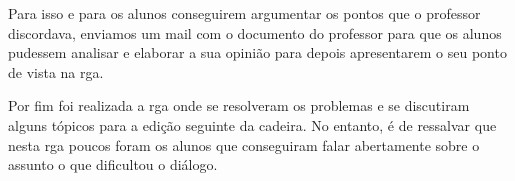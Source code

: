 Para isso e para os alunos conseguirem argumentar os pontos que o professor discordava, enviamos um mail com o documento do professor para que os alunos pudessem analisar e elaborar a sua opinião para depois apresentarem o seu ponto de vista na \acrshort{rga}.

Por fim foi realizada a \acrshort{rga} onde se resolveram os problemas e se discutiram alguns tópicos para a edição seguinte da cadeira. No entanto, é de ressalvar que nesta \acrshort{rga} poucos foram os alunos que conseguiram falar abertamente sobre o assunto o que dificultou o diálogo.